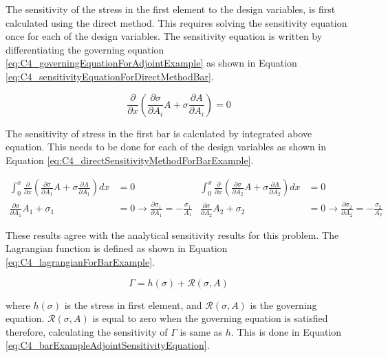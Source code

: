 The sensitivity of the stress in the first element to the design variables, is first calculated using the direct method. This requires solving the sensitivity equation once for each of the design variables. The sensitivity equation is written by differentiating the governing equation \eqref{eq:C4_governingEquationForAdjointExample} as shown in Equation \eqref{eq:C4_sensitivityEquationForDirectMethodBar}.

\begin{equation}\label{eq:C4_sensitivityEquationForDirectMethodBar}
	\frac{\partial}{\partial x}
	\left(
	\frac{\partial \sigma}{\partial A_i} A + \sigma \frac{\partial A}{\partial A_i}
	\right) = 0
\end{equation}

The sensitivity of stress in the first bar is calculated by integrated above equation. This needs to be done for each of the design variables as shown in Equation \eqref{eq:C4_directSensitivityMethodForBarExample}.

\begin{subequations}\label{eq:C4_directSensitivityMethodForBarExample}
\begin{align}
	\int_0^x
	\frac{\partial}{\partial x}
	\left(
	\frac{\partial \sigma}{\partial A_1} A + \sigma \frac{\partial A}{\partial A_1}
	\right) dx &= 0 \nonumber \\
	\frac{\partial \sigma}{\partial A_1} A_1 + \sigma_1 &= 0 \rightarrow 
	\frac{\partial \sigma_1}{\partial A_1} = -\frac{\sigma_1}{A_1}
\end{align}
\begin{align}
	\int_0^x
	\frac{\partial}{\partial x}
	\left(
	\frac{\partial \sigma}{\partial A_2} A + \sigma \frac{\partial A}{\partial A_2}
	\right) dx &= 0 \nonumber \\
	\frac{\partial \sigma}{\partial A_2} A_2 + \sigma_2 &= 0 \rightarrow 
	\frac{\partial \sigma_2}{\partial A_2} = -\frac{\sigma_2}{A_2}
\end{align}
\end{subequations}

These results agree with the analytical sensitivity results for this problem. The Lagrangian function is defined as shown in Equation \eqref{eq:C4_lagrangianForBarExample}.

\begin{equation}\label{eq:C4_lagrangianForBarExample}
	\Gamma = h(\sigma) + \mathcal{R}(\sigma, A)
\end{equation}

where $h(\sigma)$ is the stress in first element, and $\mathcal{R}(\sigma, A)$ is the governing equation. $\mathcal{R}(\sigma, A)$ is equal to zero when the governing equation is satisfied therefore, calculating the sensitivity of $\Gamma$ is same as $h$. This is done in Equation \eqref{eq:C4_barExampleAdjointSensitivityEquation}.

